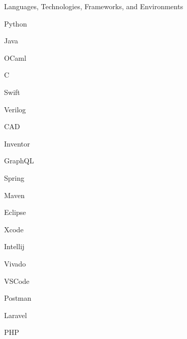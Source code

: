 \documentclass[]{mcdowellcv}
\begin{document}
  \begin{cvsection}{Languages, Technologies, Frameworks, and Environments}
    \begin{cvsubsection}{}{}{}	
      \begin{itemize*}
        \item Python
        \item Java
        \item OCaml
        \item C
        \item Swift
        \item Verilog
        \item CAD
        \item Inventor
        \item GraphQL
        \item Spring
        \item Maven
        \item Eclipse
        \item Xcode
        \item Intellij
        \item Vivado
        \item VSCode
        \item Postman
        \item Laravel
        \item PHP
      \end{itemize*}
    \end{cvsubsection}
  \end{cvsection}
\end{document}

